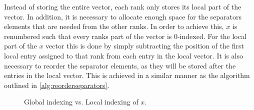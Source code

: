 
Instead of storing the entire vector, each rank only stores its local part of the vector. In addition, it is necessary to allocate enough space for the separators elements that are needed from the other ranks. In order to achieve this, \(x\) is renumbered such that every ranks part of the vector is 0-indexed. For the local part of the \(x\) vector this is done by simply subtracting the position of the first local entry assigned to that rank from each entry in the local vector. It is also necessary to reorder the separator elements, as they will be stored after the entries in the local vector. This is achieved in a similar manner as the algorithm outlined in \ref{alg:reorderseparators}.

\medskip



\begin{figure}[ht]
    \centering
    \caption{Global indexing vs. Local indexing of \(x\).}
    \label{fig:2dcomm}
\end{figure}









